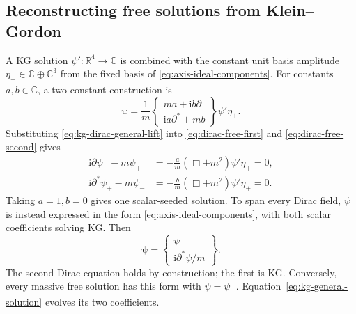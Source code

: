 \documentclass[11pt]{article}
\newcommand{\pvGreek}[1]{{#1}}
\newcommand{\vstyle}[1]{{\bm{\mathrm{#1}}}}
\newcommand{\pveta}{\pvGreek{\eta}}
\newcommand{\pvpartial}{\pvGreek{\partial}}
\newcommand{\pvpsi}{\pvGreek{\psi}}
\numberwithin{equation}{section}
\newcommand{\R}{\mathbb{R}}
\newcommand{\C}{\mathbb{C}}
\newcommand{\ii}{\mathrm{i}}
\newcommand{\bpsi}{\vstyle{\psi}}
\begin{document}
\subsection{Reconstructing free solutions from Klein--Gordon}
A KG solution $\psi':\R^4\to\C$ is combined with the constant unit basis amplitude
$\pveta_+\in\C\oplus\C^3$ from the fixed basis of
\eqref{eq:axis-ideal-components}. For constants $a,b\in\C$, a two-constant construction is
\begin{equation}
 \bpsi=\frac1m
 \begin{Bmatrix}
  ma+\ii b\pvpartial\\
  \ii a\pvpartial^*+mb
 \end{Bmatrix}\psi'\pveta_+.
 \label{eq:kg-dirac-general-lift}
\end{equation}
Substituting \eqref{eq:kg-dirac-general-lift} into
\eqref{eq:dirac-free-first} and \eqref{eq:dirac-free-second} gives
\begin{align*}
 \ii\pvpartial\pvpsi_--m\pvpsi_+
    &=-\frac{a}{m}(\Box+m^2)\psi'\pveta_+=0,\\
 \ii\pvpartial^*\pvpsi_+-m\pvpsi_-
    &=-\frac{b}{m}(\Box+m^2)\psi'\pveta_+=0.
\end{align*}
Taking $a=1,b=0$ gives one scalar-seeded solution.  To span every
Dirac field, $\pvpsi$ is instead expressed in the form \eqref{eq:axis-ideal-components},
with both scalar coefficients solving KG.  Then
\begin{equation}
 \boxed{\bpsi=\begin{Bmatrix}\pvpsi\\\ii\pvpartial^*\pvpsi/m\end{Bmatrix}.}
 \label{eq:kg-dirac-complete-lift}
\end{equation}
The second Dirac equation holds by construction; the first is KG.
Conversely, every massive free solution has this form with $\pvpsi=\pvpsi_+$.
Equation~\eqref{eq:kg-general-solution} evolves its two coefficients.
\end{document}

